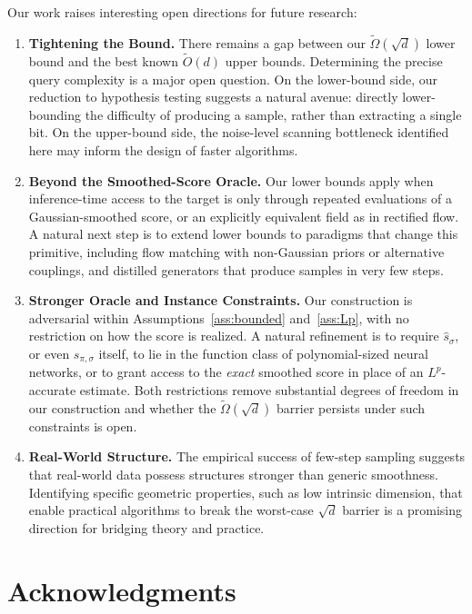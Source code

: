 \documentclass[11pt,letterpaper]{article}
\newcommand{\1}{\mathbbm{1}}
\begin{document}
Our work raises interesting open directions for future research:
\begin{enumerate}
\item \textbf{Tightening the Bound.}
There remains a gap between our $\widetilde\Omega(\sqrt{d})$ lower
bound and the best known $\widetilde O(d)$ upper bounds.
Determining the precise query complexity is a major open question.
On the lower-bound side, our reduction to hypothesis testing
suggests a natural avenue: directly lower-bounding the difficulty
of producing a sample, rather than extracting a single bit.
On the upper-bound side, the noise-level scanning bottleneck
identified here may inform the design of faster algorithms.
    \item \textbf{Beyond the Smoothed-Score Oracle.}
Our lower bounds apply when inference-time access to the target is only through repeated evaluations of a Gaussian-smoothed score, or an explicitly equivalent field as in rectified flow.
A natural next step is to extend lower bounds to paradigms that change this primitive, including flow matching with non-Gaussian priors or alternative couplings, and distilled generators that produce samples in very few steps.

     \item \textbf{Stronger Oracle and Instance Constraints.}
Our construction is adversarial within Assumptions~\ref{ass:bounded} and~\ref{ass:Lp}, with no restriction on how the score is realized. A natural refinement is to require $\widehat s_\sigma$, or even $s_{\pi,\sigma}$ itself, to lie in the function class of polynomial-sized neural networks, or to grant access to the \emph{exact} smoothed score in place of an $L^p$-accurate estimate.
Both restrictions remove substantial degrees of freedom in our construction
and whether the $\widetilde\Omega(\sqrt d)$ barrier persists under such constraints is open.

    \item \textbf{Real-World Structure.} The empirical success of few-step sampling suggests that real-world data possess structures stronger than generic smoothness. Identifying specific geometric properties, such as low intrinsic dimension, that enable practical algorithms to break the worst-case $\sqrt{d}$ barrier is a promising direction for bridging theory and practice.
\end{enumerate}

\section*{Acknowledgments}
\end{document}
